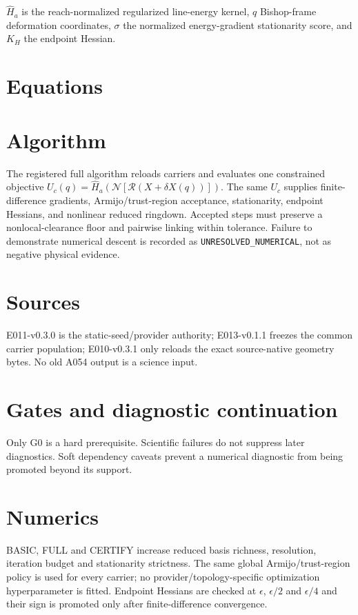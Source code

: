 \documentclass[11pt]{article}
\begin{document}
$\widehat H_a$ is the reach-normalized regularized line-energy kernel, $q$ Bishop-frame deformation coordinates, $\sigma$ the normalized energy-gradient stationarity score, and $K_H$ the endpoint Hessian.
\section{Equations}

\section{Algorithm}
The registered full algorithm reloads carriers and evaluates one constrained objective $U_c(q)=\widehat H_a(\mathcal N[\mathcal R(X+\delta X(q))])$. The same $U_c$ supplies finite-difference gradients, Armijo/trust-region acceptance, stationarity, endpoint Hessians, and nonlinear reduced ringdown. Accepted steps must preserve a nonlocal-clearance floor and pairwise linking within tolerance. Failure to demonstrate numerical descent is recorded as \texttt{UNRESOLVED\_NUMERICAL}, not as negative physical evidence.
\section{Sources}
E011-v0.3.0 is the static-seed/provider authority; E013-v0.1.1 freezes the common carrier population; E010-v0.3.1 only reloads the exact source-native geometry bytes. No old A054 output is a science input.
\section{Gates and diagnostic continuation}
Only G0 is a hard prerequisite. Scientific failures do not suppress later diagnostics. Soft dependency caveats prevent a numerical diagnostic from being promoted beyond its support.
\section{Numerics}
BASIC, FULL and CERTIFY increase reduced basis richness, resolution, iteration budget and stationarity strictness. The same global Armijo/trust-region policy is used for every carrier; no provider/topology-specific optimization hyperparameter is fitted. Endpoint Hessians are checked at $\epsilon$, $\epsilon/2$ and $\epsilon/4$ and their sign is promoted only after finite-difference convergence.
\end{document}
